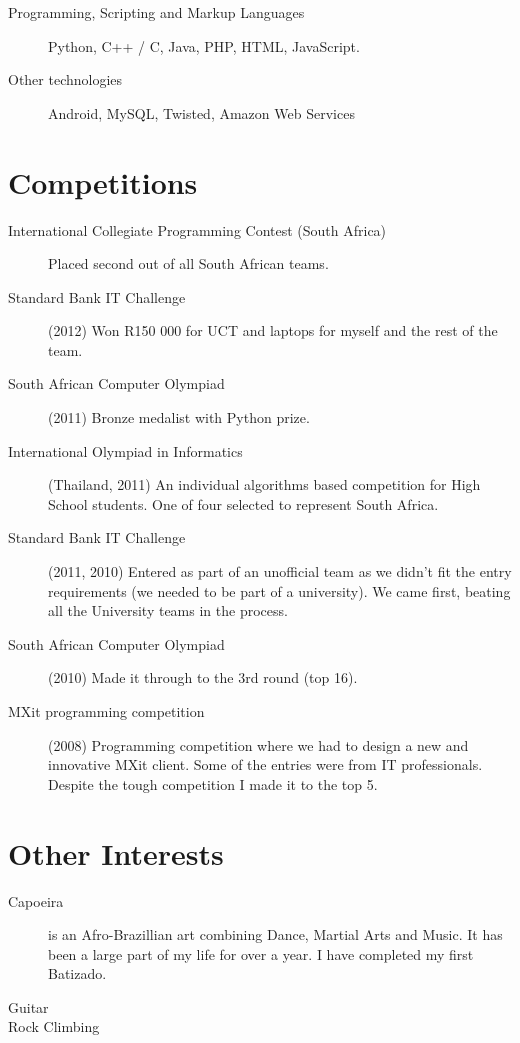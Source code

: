\documentclass[margin,line,a4paper]{resume}
\begin{document}
\begin{resume}
\begin{description}
                \item [Programming, Scripting and Markup Languages] Python, C++ / C, Java, PHP, HTML, JavaScript.

                \item [Other technologies] Android, MySQL, Twisted, Amazon Web Services
            \end{description}

        \section{\mysidestyle Competitions}
            \begin{description}
                \item [International Collegiate Programming Contest (South Africa)] Placed second out of all South African teams.
                \item [Standard Bank IT Challenge] (2012) Won R150 000 for UCT and laptops for myself and the rest of the team.
                \item [South African Computer Olympiad] (2011) Bronze medalist with Python prize.

                \item [International Olympiad in Informatics] (Thailand, 2011) An individual 
                algorithms based competition for High School students. One of four selected
                to represent South Africa.

                \item [Standard Bank IT Challenge] (2011, 2010) Entered as part of an unofficial team
                as we didn't fit the entry requirements (we needed to be part of a university).
                We came first, beating all the University teams in the process.

                \item [South African Computer Olympiad] (2010) Made it through to the 3rd
                round (top 16).

                \item [MXit programming competition] (2008) Programming competition where we
                had to design a new and innovative MXit client.  Some of the
                entries were from IT professionals. Despite the tough competition I made it to the top 5.
            \end{description}

        \section{\mysidestyle Other Interests}
            \begin{description}
                \item[Capoeira] is an Afro-Brazillian art combining Dance, Martial Arts and Music. It has
                    been a large part of my life for over a year. I have completed my first Batizado.
                \item[Guitar]
                \item[Rock Climbing]
            \end{description}


\end{resume}
\end{document}
